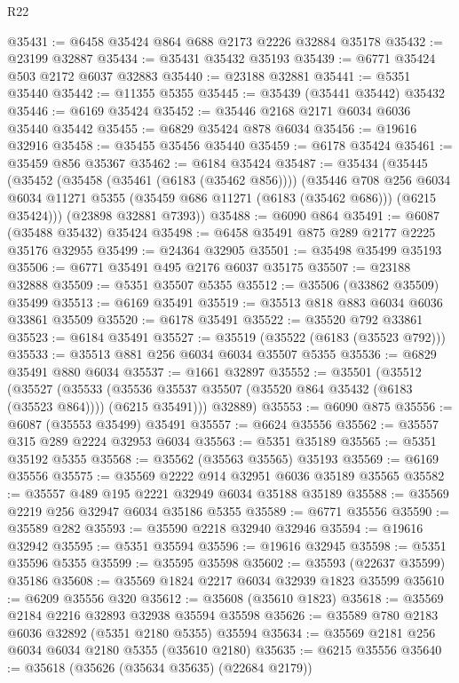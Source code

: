 \begin{lexlean}{R22}
\begin{coremodule}
@35431 := @6458 @35424 @864 @688 @2173 @2226 @32884 @35178
@35432 := @23199 @32887
@35434 := @35431 @35432 @35193
@35439 := @6771 @35424 @503 @2172 @6037 @32883
@35440 := @23188 @32881
@35441 := @5351 @35440
@35442 := @11355 @5355
@35445 := @35439 (@35441 @35442) @35432
@35446 := @6169 @35424
@35452 := @35446 @2168 @2171 @6034 @6036 @35440 @35442
@35455 := @6829 @35424 @878 @6034
@35456 := @19616 @32916
@35458 := @35455 @35456 @35440
@35459 := @6178 @35424
@35461 := @35459 @856 @35367
@35462 := @6184 @35424
@35487 := @35434
    (@35445
      (@35452
        (@35458 (@35461 (@6183 (@35462 @856))))
        (@35446
          @708
          @256
          @6034
          @6034
          @11271
          @5355
          (@35459 @686 @11271 (@6183 (@35462 @686)))
          (@6215 @35424)))
      (@23898 @32881 @7393))
@35488 := @6090 @864
@35491 := @6087 (@35488 @35432) @35424
@35498 := @6458 @35491 @875 @289 @2177 @2225 @35176 @32955
@35499 := @24364 @32905
@35501 := @35498 @35499 @35193
@35506 := @6771 @35491 @495 @2176 @6037 @35175
@35507 := @23188 @32888
@35509 := @5351 @35507 @5355
@35512 := @35506 (@33862 @35509) @35499
@35513 := @6169 @35491
@35519 := @35513 @818 @883 @6034 @6036 @33861 @35509
@35520 := @6178 @35491
@35522 := @35520 @792 @33861
@35523 := @6184 @35491
@35527 := @35519 (@35522 (@6183 (@35523 @792)))
@35533 := @35513 @881 @256 @6034 @6034 @35507 @5355
@35536 := @6829 @35491 @880 @6034
@35537 := @1661 @32897
@35552 := @35501
    (@35512
      (@35527
        (@35533 (@35536 @35537 @35507 (@35520 @864 @35432 (@6183 (@35523 @864)))) (@6215 @35491)))
      @32889)
@35553 := @6090 @875
@35556 := @6087 (@35553 @35499) @35491
@35557 := @6624 @35556
@35562 := @35557 @315 @289 @2224 @32953 @6034
@35563 := @5351 @35189
@35565 := @5351 @35192 @5355
@35568 := @35562 (@35563 @35565) @35193
@35569 := @6169 @35556
@35575 := @35569 @2222 @914 @32951 @6036 @35189 @35565
@35582 := @35557 @489 @195 @2221 @32949 @6034 @35188 @35189
@35588 := @35569 @2219 @256 @32947 @6034 @35186 @5355
@35589 := @6771 @35556
@35590 := @35589 @282
@35593 := @35590 @2218 @32940 @32946
@35594 := @19616 @32942
@35595 := @5351 @35594
@35596 := @19616 @32945
@35598 := @5351 @35596 @5355
@35599 := @35595 @35598
@35602 := @35593 (@22637 @35599) @35186
@35608 := @35569 @1824 @2217 @6034 @32939 @1823 @35599
@35610 := @6209 @35556 @320
@35612 := @35608 (@35610 @1823)
@35618 := @35569 @2184 @2216 @32893 @32938 @35594 @35598
@35626 := @35589 @780 @2183 @6036 @32892 (@5351 @2180 @5355) @35594
@35634 := @35569 @2181 @256 @6034 @6034 @2180 @5355 (@35610 @2180)
@35635 := @6215 @35556
@35640 := @35618 (@35626 (@35634 @35635) (@22684 @2179))

\end{coremodule}
\end{lexlean}

